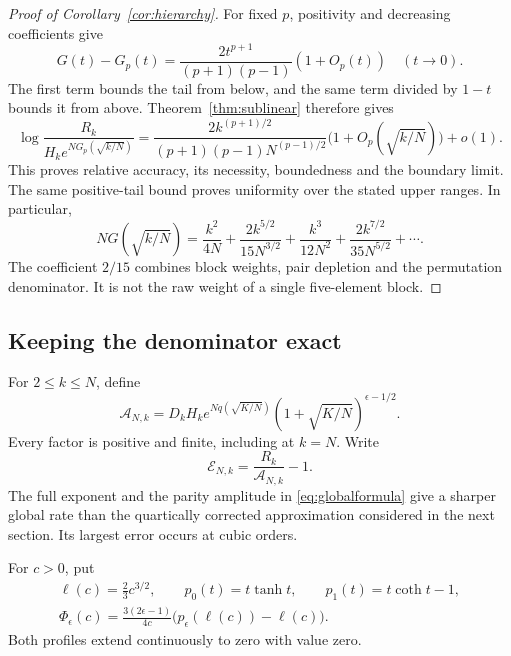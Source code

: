 \documentclass[11pt]{article}
\theoremstyle{definition}
\theoremstyle{remark}
\newcommand{\1}{\mathbf 1}
\begin{document}
\begin{proof}[Proof of Corollary~\ref{cor:hierarchy}]
For fixed $p$, positivity and decreasing coefficients give
\[
G(t)-G_p(t)=\frac{2t^{p+1}}{(p+1)(p-1)}(1+O_p(t))
\quad(t\to0).
\]
The first term bounds the tail from below, and the same term divided by $1-t$ bounds it from above. Theorem~\ref{thm:sublinear} therefore gives
\[
\log\frac{R_k}{H_ke^{NG_p(\sqrt{k/N})}}
=\frac{2k^{(p+1)/2}}{(p+1)(p-1)N^{(p-1)/2}}
\bigl(1+O_p(\sqrt{k/N})\bigr)+o(1).
\]
This proves relative accuracy, its necessity, boundedness and the boundary limit. The same positive-tail bound proves uniformity over the stated upper ranges. In particular,
\[
NG(\sqrt{k/N})
=\frac{k^2}{4N}+\frac{2k^{5/2}}{15N^{3/2}}
+\frac{k^3}{12N^2}+\frac{2k^{7/2}}{35N^{5/2}}+\cdots.
\]
The coefficient $2/15$ combines block weights, pair depletion and the permutation denominator. It is not the raw weight of a single five-element block.
\end{proof}

\subsection{Keeping the denominator exact}

For $2\le k\le N$, define
\begin{equation}\label{eq:globalformula}
\mathcal A_{N,k}
=D_kH_k e^{Nq(\sqrt{K/N})}
(1+\sqrt{K/N})^{\epsilon-1/2}.
\end{equation}
Every factor is positive and finite, including at $k=N$. Write
\[
\mathcal E_{N,k}=\frac{R_k}{\mathcal A_{N,k}}-1.
\]
The full exponent and the parity amplitude in \eqref{eq:globalformula} give a sharper global rate than the quartically corrected approximation considered in the next section. Its largest error occurs at cubic orders.

For $c>0$, put
\begin{equation}\label{eq:globalprofiledef}
\begin{gathered}
\ell(c)=\frac23c^{3/2},\qquad
p_0(t)=t\tanh t,\qquad p_1(t)=t\coth t-1,\\
\Phi_\epsilon(c)=\frac{3(2\epsilon-1)}{4c}
\bigl(p_\epsilon(\ell(c))-\ell(c)\bigr).
\end{gathered}
\end{equation}
Both profiles extend continuously to zero with value zero.
\end{document}
